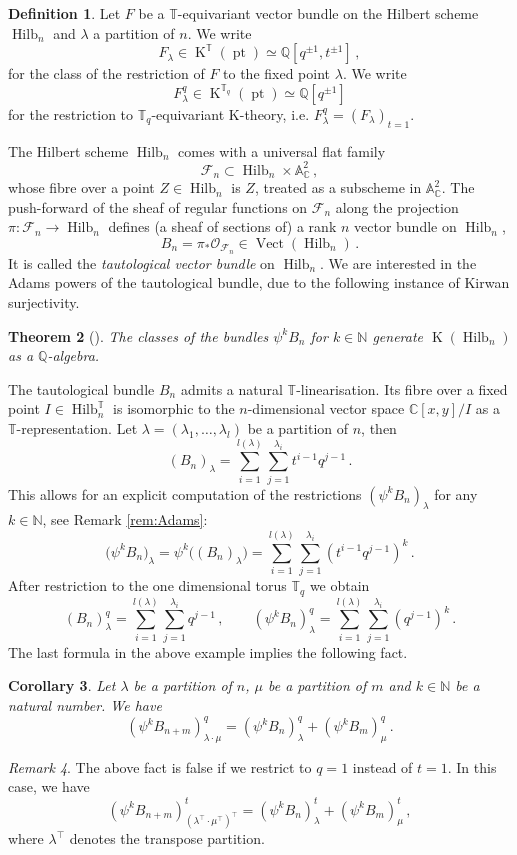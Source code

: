 \documentclass[12pt,a4paper]{amsart}
\theoremstyle{plain}
\newtheorem{tw}{Theorem}[section]
\newtheorem{cor}[tw]{Corollary}
\theoremstyle{definition}
\newtheorem{df}[tw]{Definition}
\theoremstyle{remark}
\newtheorem{rem}[tw]{Remark}
\newcommand{\Hilb}[1]{\operatorname{Hilb}_{{#1}}}
\newcommand{\pt}{\operatorname{pt}}
\newcommand{\NN}{\mathbb{N}}
\newcommand{\QQ}{\mathbb{Q}}
\newcommand{\CC}{\mathbb{C}}
\newcommand{\Aa}{\mathbb{A}}
\newcommand{\TT}{\mathbb{T}}
\newcommand{\Tq}{{\mathbb{T}_q}}
\DeclareMathOperator{\KTh}{K}
\begin{document}
\begin{df}
	Let $F$ be a $\TT$-equivariant vector bundle on the Hilbert scheme $\Hilb{n}$ and $\lambda$ a partition of $n$. We write
	$$ F_\lambda \in \KTh^\TT(\pt)\simeq \QQ[q^{\pm 1},t^{\pm 1}]\,,$$
	for the class of the restriction of $F$ to the fixed point $\lambda$.
	We write
	$$ F^q_\lambda \in \KTh^{\Tq}(\pt)\simeq \QQ[q^{\pm 1}] $$
	for the restriction to $\Tq$-equivariant K-theory, i.e. $F^q_\lambda= (F_\lambda)_{t=1}$.
\end{df}
The Hilbert scheme $\Hilb{n}$ comes with a universal flat family
$$\mathcal{F}_n \subset \Hilb{n} \times \Aa^2_\CC\,,$$
whose fibre over a point $Z\in \Hilb{n}$ is $Z$, treated as a subscheme in $\Aa^2_\CC$. The push-forward of the sheaf of regular functions on $\mathcal{F}_n$ along the projection $\pi: \mathcal{F}_n \to \Hilb{n}$ defines (a sheaf of sections of) a rank $n$ vector bundle on $\Hilb{n}$,
$$B_n =\pi_{\ast} \mathcal{O}_{\mathcal{F}_n} \in \operatorname{Vect}(\Hilb{n})\,.$$
It is called the \emph{tautological vector bundle} on $\Hilb{n}$. We are interested in the Adams powers of the tautological bundle, due to the following instance of Kirwan surjectivity.
\begin{tw}[{\cite[Corollary 1.4]{QuiverKirwan}}] \label{tw:Kirwan}
	The classes of the bundles $\psi^kB_n$ for $k\in \NN$ generate $\KTh(\Hilb{n})$ as a $\QQ$-algebra.
\end{tw}
The tautological bundle $B_n$ admits a natural $\TT$-linearisation. Its fibre over a fixed point $I\in \Hilb{n}^\TT$ is isomorphic to the $n$-dimensional vector space $\CC[x,y]/I$ as a $\TT$-representation. Let $\lambda=(\lambda_1,\dots,\lambda_l)$ be a partition of $n$, then
	$$(B_n)_{\lambda}=\sum^{l(\lambda)}_{i=1} \sum_{j=1}^{\lambda_i} t^{i-1}q^{j-1}\,.$$
	This allows for an explicit computation of the restrictions $(\psi^kB_{n})_{\lambda}$ for any $k\in \NN$, see Remark \ref{rem:Adams}:
	$$
	\big(\psi^kB_{n}\big)_{\lambda}=\psi^k\big((B_{n})_{\lambda}\big)=
	\sum^{l(\lambda)}_{i=1} \sum_{j=1}^{\lambda_i} (t^{i-1}q^{j-1})^k\,.
	$$
	After restriction to the one dimensional torus $\TT_q$ we obtain
	$$
	(B_n)^q_{\lambda}=\sum^{l(\lambda)}_{i=1} \sum_{j=1}^{\lambda_i} q^{j-1}
	\,, \qquad
	(\psi^kB_{n})^q_{\lambda}=\sum^{l(\lambda)}_{i=1} \sum_{j=1}^{\lambda_i} (q^{j-1})^k\,.
	$$
The last formula in the above example implies the following fact.
\begin{cor} \label{cor:Adams}
	Let $\lambda$ be a partition of $n$, $\mu$ be a partition of $m$ and $k\in \NN$ be a natural number. We have
	$$ (\psi^kB_{n+m})^q_{\lambda\cdot\mu}=(\psi^kB_{n})^q_{\lambda}+(\psi^kB_{m})^q_{\mu}\,. $$
\end{cor}
\begin{rem}
	The above fact is false if we restrict to $q=1$ instead of $t=1$. In this case, we have
	$$ (\psi^kB_{n+m})^t_{(\lambda^\top\cdot\mu^\top)^\top}=(\psi^kB_{n})^t_{\lambda}+(\psi^kB_{m})^t_{\mu}\,, $$
	where $\lambda^\top$ denotes the transpose partition.
\end{rem}
\end{document}
